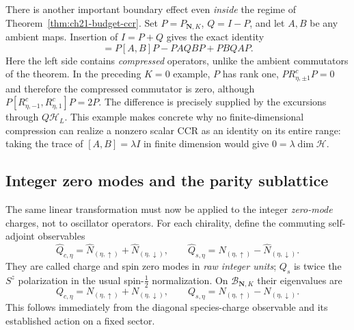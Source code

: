 There is another important boundary effect even \emph{inside} the
regime of Theorem~\ref{thm:ch21-budget-ccr}.  Set
$P=P_{\mathbf N,K}$, $Q=I-P$, and let $A,B$ be any ambient maps.
Insertion of $I=P+Q$ gives the exact identity
\begin{equation}
 [PAP,PBP]
   =P[A,B]P-PAQBP+PBQAP.
 \label{eq:ch21-compression-residual}
\end{equation}
Here the left side contains \emph{compressed} operators, unlike the
ambient commutators of the theorem.  In the preceding $K=0$ example,
$P$ has rank one, $PR^{c}_{\eta,\pm1}P=0$ and therefore the
compressed commutator is zero, although
$P[R^c_{\eta,-1},R^c_{\eta,1}]P=2P$.  The difference is precisely
supplied by the excursions through $Q\mathcal H_L$.  This example
makes concrete why no finite-dimensional compression can realize a
nonzero scalar CCR as an identity on its entire range: taking the
trace of $[A,B]=\lambda I$ in finite dimension would give
$0=\lambda\dim\mathcal H$.

\subsection*{Integer zero modes and the parity sublattice}

The same linear transformation must now be applied to the integer
\emph{zero-mode} charges, not to oscillator operators.  For each
chirality, define the commuting self-adjoint observables
\begin{equation}
 \widehat Q_{c,\eta}=\widehat N_{(\eta,\uparrow)}
                         +\widehat N_{(\eta,\downarrow)},
 \qquad
 \widehat Q_{s,\eta}=\widehat N_{(\eta,\uparrow)}
                         -\widehat N_{(\eta,\downarrow)}.
 \label{eq:ch21-zero-modes}
\end{equation}
They are called charge and spin zero modes in \emph{raw integer units};
$Q_s$ is twice the $S^z$ polarization in the usual spin-$\tfrac12$
normalization.  On $\mathcal B_{\mathbf N,K}$ their eigenvalues are
\begin{equation}
 Q_{c,\eta}=N_{(\eta,\uparrow)}+N_{(\eta,\downarrow)},
 \qquad
 Q_{s,\eta}=N_{(\eta,\uparrow)}-N_{(\eta,\downarrow)}.
 \label{eq:ch21-zero-eigenvalues}
\end{equation}
This follows immediately from the diagonal species-charge observable
and its established action on a fixed sector.

